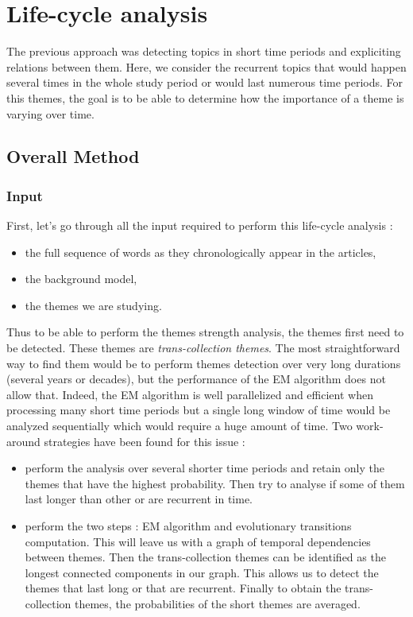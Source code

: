 \section{Life-cycle analysis}
The previous approach was detecting topics in short time periods and expliciting relations between them. Here, we consider the recurrent topics that would happen several times in the whole study period or would last numerous time periods. For this themes, the goal is to be able to determine how the importance of a theme is varying over time.

\subsection{Overall Method}

\subsubsection*{Input}
First, let's go through all the input required to perform this life-cycle analysis :
\begin{itemize}
\item the full sequence of words as they chronologically appear in the articles,
\item the background model,
\item the themes we are studying.

\end{itemize}

Thus to be able to perform the themes strength analysis, the themes first need to be detected. These themes are \emph{trans-collection themes}. The most straightforward way to find them would be to perform themes detection over very long durations (several years or decades), but the performance of the EM algorithm does not allow that. Indeed, the EM algorithm is well parallelized and efficient when processing many short time periods but a single long window of time would be analyzed sequentially which would require a huge amount of time. Two work-around strategies have been found for this issue :
\begin{itemize}
\item perform the analysis over several shorter time periods and retain only the themes that have the highest probability. Then try to analyse if some of them last longer than other or are recurrent in time.
\item perform the two steps  : EM algorithm and evolutionary transitions computation. This will leave us with a graph of temporal dependencies between themes. Then the trans-collection themes can be identified as the longest connected components in our graph. This allows us to detect the themes that last long or that are recurrent. Finally to obtain the trans-collection themes, the probabilities of the short themes are averaged.
\end{itemize}

